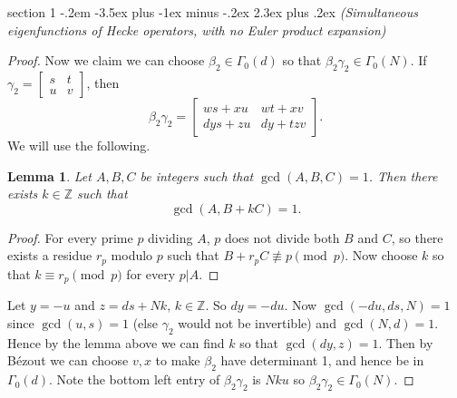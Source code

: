 \documentclass[12pt]{article}
\makeatletter
\theoremstyle{norm}
\newtheorem{lem}[thm]{Lemma}
\newcommand{\Z}[0]{\mathbb{Z}}
\newcommand{\nin}[0]{\not\in}
\newcommand{\be}[0]{\beta}
\newcommand{\ga}[0]{\gamma}
\newcommand{\Ga}[0]{\Gamma}
\newcommand{\GL}{\operatorname{GL}}
\newcommand{\matt}[4]{
\left[
\begin{matrix}
{#1}&{#2}\\
{#3}&{#4}
\end{matrix}
\right]}
\newcommand{\smatt}[4]{
\left[
\begin{smallmatrix}
{#1}&{#2}\\
{#3}&{#4}
\end{smallmatrix}
\right]}
\newcommand{\nequiv}[0]{\not\equiv}
\newenvironment{problem}{\@startsection
       {section}
       {1}
       {-.2em}
       {-3.5ex plus -1ex minus -.2ex}
       {2.3ex plus .2ex}
       {\pagebreak[3]%
       \large\bf\noindent{Problem }
       }
       }
       {%
       }
\makeatother
\begin{document}
\begin{problem}{\it (Simultaneous eigenfunctions of Hecke operators, with no Euler product expansion)}
\begin{proof}
Now we claim we can choose $\be_2\in \Ga_0(d)$ so that $\be_2 \ga_2\in \Ga_0(N)$. If $\ga_2=\smatt stuv$, then
\[
\be_2\ga_2=\matt{ws+xu}{wt+xv}{dys+zu}{dy+tzv}.
\]
We will use the following.
\begin{lem}\label{p6-1-sublem}
Let $A,B,C$ be integers such that $\gcd(A,B,C)=1$. Then there exists $k\in \Z$ such that 
\[
\gcd(A,B+kC)=1.
\]
\end{lem}
\begin{proof}
For every prime $p$ dividing $A$, $p$ does not divide both $B$ and $C$, so there exists a residue $r_p$ modulo $p$ such that $B+r_pC\nequiv p\pmod p$. Now choose $k$ so that $k\equiv r_p\pmod p$ for every $p|A$.
\end{proof}
Let $y=-u$ and $z=ds+Nk,\,k\in\Z$. So $dy=-du$. Now $\gcd(-du,ds, N)=1$ since $\gcd(u,s)=1$ (else $\ga_2$ would not be invertible) and $\gcd(N,d)=1$. Hence by the lemma above we can find $k$ so that $\gcd(dy,z)=1$. Then by B\'ezout we can choose $v,x$ to make $\be_2$ have determinant 1, and hence be in $\Ga_0(d)$. Note the bottom left entry of $\be_2 \ga_2$ is $Nku$ so $\be_2\ga_2\in \Ga_0(N)$.



\end{proof}
\end{problem}
\end{document}
